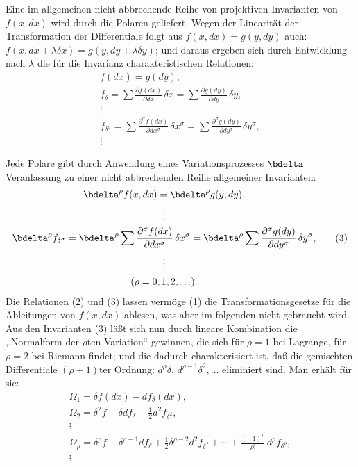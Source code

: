 \documentclass[11pt]{article}
\begin{document}
Eine im allgemeinen nicht abbrechende Reihe von projektiven Invarianten
von \(f(x,dx)\) wird durch die Polaren geliefert. Wegen der Linearität
der Transformation der Differentiale folgt aus
\(f(x,dx)=g(y,dy)\) auch:
\(f(x,dx+\lambda\delta x)=g(y,dy+\lambda\delta y)\); und daraus ergeben
sich durch Entwicklung nach \(\lambda\) die für die Invarianz
charakteristischen Relationen:
\begin{equation}
\begin{gathered}
f(dx)=g(dy),\\
f_\delta=\sum\frac{\partial f(dx)}{\partial dx}\,\delta x
       =\sum\frac{\partial g(dy)}{\partial dy}\,\delta y,\\
\vdots\\
f_{\delta^\sigma}=
\sum\frac{\partial^\sigma f(dx)}{\partial dx^\sigma}\,\delta x^\sigma
=
\sum\frac{\partial^\sigma g(dy)}{\partial dy^\sigma}\,\delta y^\sigma,\\
\vdots
\end{gathered}
\tag{2}
\end{equation}

Jede Polare gibt durch Anwendung eines Variationsprozesses \(\bdelta\)
Veranlassung zu einer nicht abbrechenden Reihe allgemeiner Invarianten:
\begin{equation}
\begin{gathered}
\bdelta^\rho f(x,dx)=\bdelta^\rho g(y,dy),\\
\vdots\\
\bdelta^\rho f_{\delta^\sigma}
=\bdelta^\rho\sum\frac{\partial^\sigma f(dx)}{\partial dx^\sigma}\,
\delta x^\sigma
=\bdelta^\rho\sum\frac{\partial^\sigma g(dy)}{\partial dy^\sigma}\,
\delta y^\sigma,\\
\vdots\\[0.2em]
(\rho=0,1,2,\ldots).
\end{gathered}
\tag{3}
\end{equation}
Die Relationen (2) und (3) lassen vermöge (1) die Transformationsgesetze
für die Ableitungen von \(f(x,dx)\) ablesen, was aber im folgenden
nicht gebraucht wird. Aus den Invarianten (3) läßt sich nun durch
lineare Kombination die ,,Normalform der \(\rho\)ten Variation``
gewinnen, die sich für \(\rho=1\) bei Lagrange, für \(\rho=2\) bei
Riemann findet; und die dadurch charakterisiert ist, daß die gemischten
Differentiale \((\rho+1)\)ter Ordnung: \(d^\rho\delta\),
\(d^{\rho-1}\delta^2,\ldots\) eliminiert sind. Man erhält für sie:
\begin{equation}
\begin{gathered}
\Omega_1=\delta f(dx)-d f_\delta(dx),\\
\Omega_2=\delta^2 f-\delta d f_\delta+\frac12 d^2 f_{\delta^2},\\
\vdots\\
\Omega_\rho=\delta^\rho f-\delta^{\rho-1}d f_\delta
+\frac12\delta^{\rho-2}d^2 f_{\delta^2}
+\cdots+\frac{(-1)^\rho}{\rho!}\,d^\rho f_{\delta^\rho},\\
\vdots
\end{gathered}
\tag{4}
\end{equation}
\end{document}
